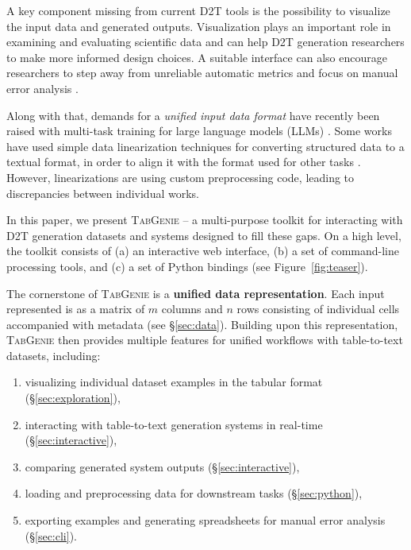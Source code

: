 A key component missing from current D2T tools is the possibility to visualize the input data and generated outputs. Visualization plays an important role in examining and evaluating scientific data \cite{Kehrer2013VisualizationAV} and can help D2T generation researchers to make more informed design choices. A suitable interface can also encourage researchers to step away from unreliable automatic metrics \cite{gehrmann2022repairing} and focus on manual error analysis \cite{van_miltenburg_underreporting_2021,van_miltenburg_barriers_2023}.

Along with that, demands for a \textit{unified input data format} have recently been raised with multi-task training for large language models (LLMs) \citep[\textit{inter alia}]{Sanh2021MultitaskPT,scao2022bloom,Ouyang2022TrainingLM}. Some works have used simple data linearization techniques for converting structured data to a textual format, in order to align it with the format used for other tasks \cite{UnifiedSKG,tang2022mvp}. However,  linearizations are using custom preprocessing code, leading to discrepancies between individual works.


In this paper, we present \textsc{TabGenie} -- a multi-purpose toolkit for interacting with D2T generation datasets and systems designed to fill these gaps. On a high level, the toolkit consists of (a) an interactive web interface, (b) a set of command-line processing tools, and (c) a set of Python bindings (see Figure~\ref{fig:teaser}).


The cornerstone of \textsc{TabGenie} is a \textbf{unified data representation}. Each input represented is as a matrix of $m$ columns and $n$ rows consisting of individual cells accompanied with metadata (see §\ref{sec:data}). Building upon this representation, \textsc{TabGenie} then provides multiple features for unified workflows with table-to-text datasets, including:
\begin{enumerate}
    \item visualizing individual dataset examples in the tabular format (§\ref{sec:exploration}),
    \item interacting with table-to-text generation systems in real-time (§\ref{sec:interactive}),
    \item comparing generated system outputs (§\ref{sec:interactive}),
    \item loading and preprocessing data for downstream tasks (§\ref{sec:python}),
    \item exporting examples and generating spreadsheets for manual error analysis (§\ref{sec:cli}).
\end{enumerate}

